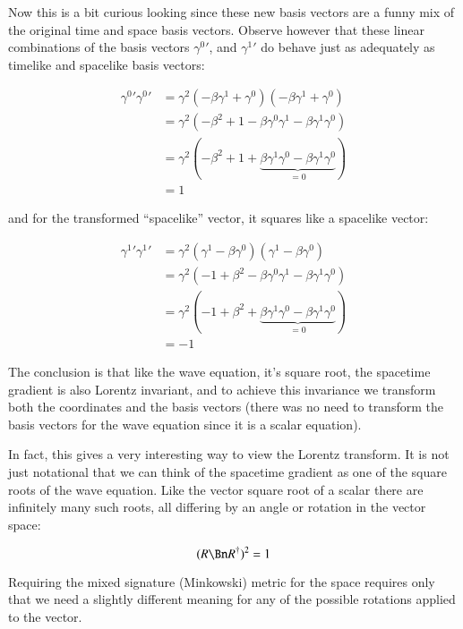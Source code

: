 Now this is a bit curious looking since these new basis vectors are a funny mix of the original time and space basis vectors.  Observe however that these linear combinations of the basis vectors ${\gamma^0}'$, and ${\gamma^1}'$ do behave just as adequately as timelike and spacelike basis vectors:

\begin{align*}
{\gamma^0}' {\gamma^0}' 
&= \gamma^2 (-\beta \gamma^1 + \gamma^0 ) (-\beta \gamma^1 + \gamma^0 ) \\
&= \gamma^2 (-\beta^2 + 1 -\beta \gamma^0\gamma^1 -\beta \gamma^1 \gamma^0 ) \\
&= \gamma^2 (-\beta^2 + 1 + \underbrace{\beta \gamma^1\gamma^0 -\beta \gamma^1 \gamma^0}_{=0} ) \\
&= 1 
\end{align*}

and for the transformed ``spacelike'' vector, it squares like a spacelike vector:

\begin{align*}
{\gamma^1}' {\gamma^1}' 
&= \gamma^2 (\gamma^1 -\beta \gamma^0) (\gamma^1 -\beta \gamma^0) \\
&= \gamma^2 (-1 + \beta^2 -\beta\gamma^0 \gamma^1 -\beta\gamma^1\gamma^0) \\
&= \gamma^2 (-1 + \beta^2 + \underbrace{\beta \gamma^1\gamma^0 -\beta \gamma^1 \gamma^0}_{=0} ) \\
&= -1 
\end{align*}

The conclusion is that like the wave equation, it's square root, the spacetime gradient is also Lorentz invariant, and to achieve this invariance we
transform both the coordinates and the basis vectors (there was no need to transform the basis vectors for the wave equation since it is a scalar
equation).

In fact, this gives a very interesting way to view the Lorentz transform.  It is not just notational that we can think of the spacetime gradient as one of the square roots of the wave equation.
Like the vector square root of a scalar 
there are infinitely many such roots, all differing by an angle or rotation in the vector space:

\begin{equation*}
(R \Bn R^\dagger)^2 = 1
\end{equation*}

Requiring the mixed signature (Minkowski) metric for the space requires only that we need a slightly different meaning for any of the possible rotations
applied to the vector.

